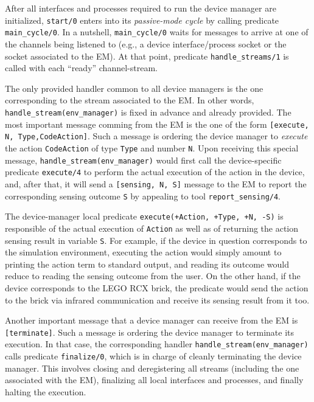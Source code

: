 \documentclass[11pt]{article}
\begin{document}
After all interfaces and processes required to run the device manager are
initialized, \texttt{start/0} enters into its \textit{passive-mode cycle} by
calling predicate \texttt{main\_cycle/0}. 
%
In a nutshell, \texttt{main\_cycle/0} waits for messages to arrive at one of the
channels being listened to (e.g., a device interface/process socket or the
socket associated to the EM). At that point, predicate
\texttt{handle\_streams/1} is called with each ``ready'' channel-stream. 

The only provided handler common to all device managers is the one
corresponding to the stream associated to the EM. In other words,
\texttt{handle\_stream(env\_manager)} is fixed in advance and already provided.
%
The most important message comming from the EM is the one of the form
\texttt{[execute, N, Type,CodeAction]}. Such a message is ordering the device
manager to \textit{execute} the action \texttt{CodeAction} of type \texttt{Type}
and number \texttt{N}.
%
Upon receiving this special message, \texttt{handle\_stream(env\_manager)}
would first call the device-specific predicate \texttt{execute/4} to perform the
actual execution of the action in the device, and, after that, it will send a
\texttt{[sensing, N, S]} message to the EM to report the corresponding sensing
outcome \texttt{S} by appealing to tool \texttt{report\_sensing/4}.

The device-manager local predicate 
\texttt{execute(+Action, +Type, +N, -S)} is responsible of the actual execution
of \texttt{Action} as well as of returning the action sensing
result in variable \texttt{S}.  
%
For example, if the device in question corresponds to the simulation 
environment, executing the action would simply amount to printing the action
term to standard output, and reading its outcome would reduce to reading the
sensing outcome from the user. On the other hand, if the device corresponds to
the LEGO RCX brick, the predicate would send the action to the brick via
infrared communication and receive its sensing result from it too.

Another important message that a device manager can receive from the EM
is \texttt{[terminate]}. Such a message is ordering the device manager to
terminate its execution. In that case,  the corresponding handler
\texttt{handle\_stream(env\_manager)} calls predicate \texttt{finalize/0},
which is in charge of cleanly terminating the device manager. This involves
closing and deregistering all streams (including the one associated with
the EM), finalizing all local interfaces and processes, and finally halting the
execution.
\end{document}
